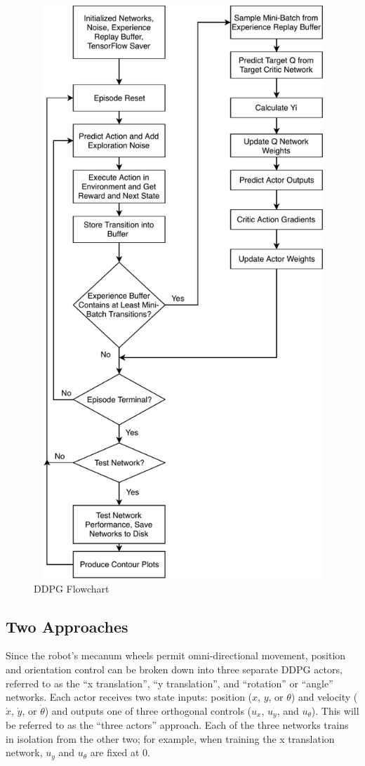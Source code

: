 \begin{figure}[H]   %
	\centering \includegraphics[width=6in, height=8.5in, keepaspectratio]{figures/ddpg_flow.pdf}
	\caption{DDPG Flowchart}\label{fig:ddpg_flow}
\end{figure}

\subsection{Two Approaches}
Since the robot's mecanum wheels permit omni-directional movement, position and orientation control can be broken down into three separate DDPG actors, referred to as the ``x translation'', ``y translation'', and ``rotation'' or ``angle'' networks. Each actor receives two state inputs: position ($x$, $y$, or $\theta$) and velocity ($\dot{x}$, $\dot{y}$, or $\dot{\theta}$) and outputs one of three orthogonal controls ($u_x$, $u_y$, and $u_\theta$). This will be referred to as the ``three actors'' approach. Each of the three networks trains in isolation from the other two; for example, when training the x translation network, $u_y$ and $u_\theta$ are fixed at 0.


